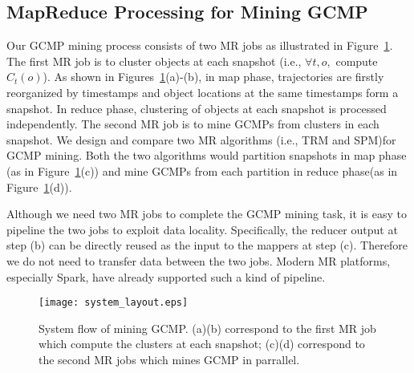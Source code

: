 \subsection{MapReduce Processing for Mining GCMP}
Our GCMP mining process consists of two MR jobs as illustrated in Figure~\ref{fig:overview}.
The first MR job is to cluster objects at each snapshot (i.e.,
 $\forall t, o,$ compute $C_t(o)$). As shown in Figures~\ref{fig:overview}(a)-(b),
in map phase, trajectories are firstly reorganized by timestamps and object locations
at the same timestamps form a snapshot. In reduce phase, clustering of objects at each
snapshot is processed independently. The second MR job is to mine GCMPs from 
clusters in each snapshot. We design and compare two MR algorithms (i.e., TRM and SPM)for 
GCMP mining. Both the two algorithms would partition snapshots in map phase
(as in Figure~\ref{fig:overview}(c))
and mine GCMPs from each partition in reduce phase(as in Figure~\ref{fig:overview}(d)).


Although we need two MR jobs to complete the GCMP mining task, 
it is easy to pipeline the two jobs to exploit data locality.
Specifically, the reducer output at step (b) can be directly reused 
as the input to the mappers at step (c). Therefore we do not need to 
transfer data between the two jobs. Modern MR platforms, especially Spark, have
already supported such a kind of pipeline.

\begin{figure} [t]
\center
\texttt{[image: system\_layout.eps]}
\caption{System flow of mining GCMP. (a)(b) correspond to the first MR job which compute the clusters at each snapshot; 
(c)(d) correspond to the second MR jobs which mines GCMP in parrallel.}
\label{fig:overview}
\end{figure}

